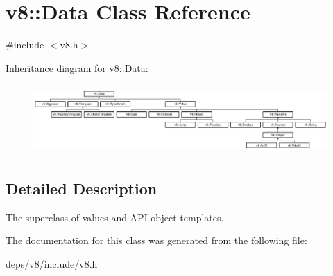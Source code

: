 \hypertarget{classv8_1_1_data}{}\section{v8\+:\+:Data Class Reference}
\label{classv8_1_1_data}


{\ttfamily \#include $<$v8.\+h$>$}

Inheritance diagram for v8\+:\+:Data\+:\begin{figure}[H]
\begin{center}
\leavevmode
\includegraphics[height=2.685851cm]{classv8_1_1_data}
\end{center}
\end{figure}


\subsection{Detailed Description}
The superclass of values and A\+P\+I object templates. 

The documentation for this class was generated from the following file\+:\begin{DoxyCompactItemize}
\item 
deps/v8/include/v8.\+h\end{DoxyCompactItemize}
